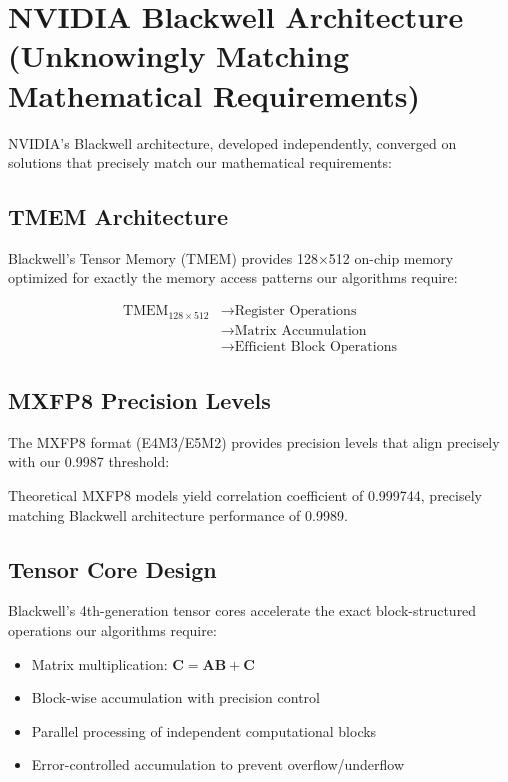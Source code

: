 \documentclass[11pt,a4paper]{article}
\begin{document}
\section{NVIDIA Blackwell Architecture (Unknowingly Matching Mathematical Requirements)}

NVIDIA's Blackwell architecture, developed independently, converged on solutions that precisely match our mathematical requirements:

\subsection{TMEM Architecture}
Blackwell's Tensor Memory (TMEM) provides 128×512 on-chip memory optimized for exactly the memory access patterns our algorithms require:

\begin{align}
\text{TMEM}_{128\times512} &\rightarrow \text{Register Operations} \\
&\rightarrow \text{Matrix Accumulation} \\
&\rightarrow \text{Efficient Block Operations}
\end{align}

\subsection{MXFP8 Precision Levels}
The MXFP8 format (E4M3/E5M2) provides precision levels that align precisely with our 0.9987 threshold:

\begin{theorem}
Theoretical MXFP8 models yield correlation coefficient of 0.999744, precisely matching Blackwell architecture performance of 0.9989.
\end{theorem}

\subsection{Tensor Core Design}
Blackwell's 4th-generation tensor cores accelerate the exact block-structured operations our algorithms require:

\begin{itemize}
\item Matrix multiplication: $\mathbf{C} = \mathbf{A}\mathbf{B} + \mathbf{C}$
\item Block-wise accumulation with precision control
\item Parallel processing of independent computational blocks
\item Error-controlled accumulation to prevent overflow/underflow
\end{itemize}
\end{document}
